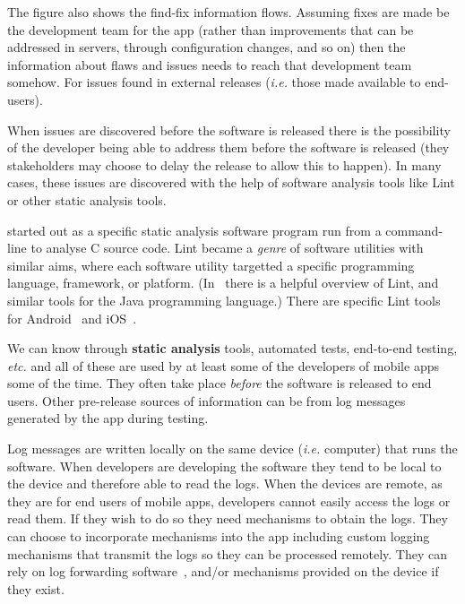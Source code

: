 The figure also shows the find-fix information flows. Assuming fixes are made be the development team for the app (rather than improvements that can be addressed in servers, through configuration changes, and so on) then the information about flaws and issues needs to reach that development team somehow. For issues found in external releases (\emph{i.e.} those made available to end-users).

When issues are discovered before the software is released there is the possibility of the developer being able to address them before the software is released (they stakeholders may choose to delay the release to allow this to happen). In many cases, these issues are discovered with the help of software analysis tools like Lint or other static analysis tools.

 started out as a specific static analysis software program run from a command-line to analyse C source code. Lint became a \emph{genre} of software utilities with similar aims, where each software utility targetted a specific programming language, framework, or platform. (In~ there is a helpful overview of Lint, and similar tools for the Java programming language.) There are specific Lint tools for Android~ and iOS~.

We can know through \textbf{static analysis} tools, automated tests, end-to-end testing, \emph{etc.} and all of these are used by at least some of the developers of mobile apps some of the time. They often take place \emph{before} the software is released to end users. Other pre-release sources of information can be from log messages generated by the app during testing.

Log messages are written locally on the same device (\emph{i.e.} computer) that runs the software. When developers are developing the software they tend to be local to the device and therefore able to read the logs. When the devices are remote, as they are for end users of mobile apps, developers cannot easily access the logs or read them. If they wish to do so they need mechanisms to obtain the logs. They can choose to incorporate mechanisms into the app including custom logging mechanisms that transmit the logs so they can be processed remotely. They can rely on log forwarding software~, and/or mechanisms provided on the device if they exist.


